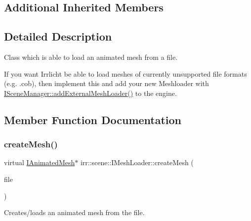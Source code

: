\subsection*{Additional Inherited Members}


\subsection{Detailed Description}
Class which is able to load an animated mesh from a file. 

If you want Irrlicht be able to load meshes of currently unsupported file formats (e.\+g. .cob), then implement this and add your new Meshloader with \hyperlink{classirr_1_1scene_1_1ISceneManager_a808972cc001db86c0576c38b3b3fbbf7}{I\+Scene\+Manager\+::add\+External\+Mesh\+Loader()} to the engine. 

\subsection{Member Function Documentation}
\mbox{\label{classirr_1_1scene_1_1IMeshLoader_ad09c19dd8c8608f0e49c40102e2aaee1}} 
\subsubsection{\texorpdfstring{create\+Mesh()}{createMesh()}}
{\footnotesize\ttfamily virtual \hyperlink{classirr_1_1scene_1_1IAnimatedMesh}{I\+Animated\+Mesh}$\ast$ irr\+::scene\+::\+I\+Mesh\+Loader\+::create\+Mesh (\begin{DoxyParamCaption}\item[{\hyperlink{classirr_1_1io_1_1IReadFile}{io\+::\+I\+Read\+File} $\ast$}]{file }\end{DoxyParamCaption})\hspace{0.3cm}{\ttfamily [pure virtual]}}



Creates/loads an animated mesh from the file. 


